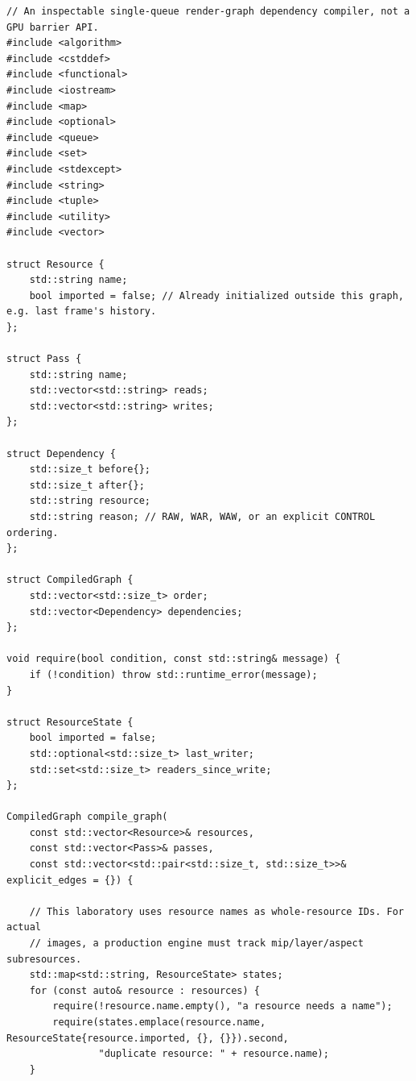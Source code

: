 \begin{verbatim}
// An inspectable single-queue render-graph dependency compiler, not a GPU barrier API.
#include <algorithm>
#include <cstddef>
#include <functional>
#include <iostream>
#include <map>
#include <optional>
#include <queue>
#include <set>
#include <stdexcept>
#include <string>
#include <tuple>
#include <utility>
#include <vector>

struct Resource {
    std::string name;
    bool imported = false; // Already initialized outside this graph, e.g. last frame's history.
};

struct Pass {
    std::string name;
    std::vector<std::string> reads;
    std::vector<std::string> writes;
};

struct Dependency {
    std::size_t before{};
    std::size_t after{};
    std::string resource;
    std::string reason; // RAW, WAR, WAW, or an explicit CONTROL ordering.
};

struct CompiledGraph {
    std::vector<std::size_t> order;
    std::vector<Dependency> dependencies;
};

void require(bool condition, const std::string& message) {
    if (!condition) throw std::runtime_error(message);
}

struct ResourceState {
    bool imported = false;
    std::optional<std::size_t> last_writer;
    std::set<std::size_t> readers_since_write;
};

CompiledGraph compile_graph(
    const std::vector<Resource>& resources,
    const std::vector<Pass>& passes,
    const std::vector<std::pair<std::size_t, std::size_t>>& explicit_edges = {}) {

    // This laboratory uses resource names as whole-resource IDs. For actual
    // images, a production engine must track mip/layer/aspect subresources.
    std::map<std::string, ResourceState> states;
    for (const auto& resource : resources) {
        require(!resource.name.empty(), "a resource needs a name");
        require(states.emplace(resource.name, ResourceState{resource.imported, {}, {}}).second,
                "duplicate resource: " + resource.name);
    }


\end{verbatim}
